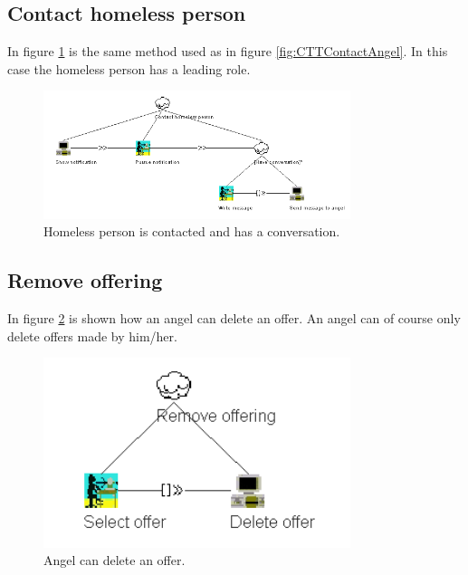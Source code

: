 \documentclass[a4paper]{report}
\begin{document}
\subsection{Contact homeless person}
In figure \ref{fig:CTTContactHomeless} is the same method used as in figure \ref{fig:CTTContactAngel}. In this case the homeless person has a leading role.
\begin{figure}[h]
    \centering
    \includegraphics[width=0.8\textwidth]{CTT/CTTpng/CTTContactHomeless.png}
    \caption{Homeless person is contacted and has a conversation.}
    \label{fig:CTTContactHomeless}
\end{figure}

\subsection{Remove offering}
In figure \ref{fig:CTTDeleteOffer} is shown how an angel can delete an offer. An angel can of course only delete offers made by him/her.
\begin{figure}[h]
    \centering
    \includegraphics[width=0.8\textwidth]{CTT/CTTpng/CTTDeleteOffer.png}
    \caption{Angel can delete an offer.}
    \label{fig:CTTDeleteOffer}
\end{figure}
\end{document}
